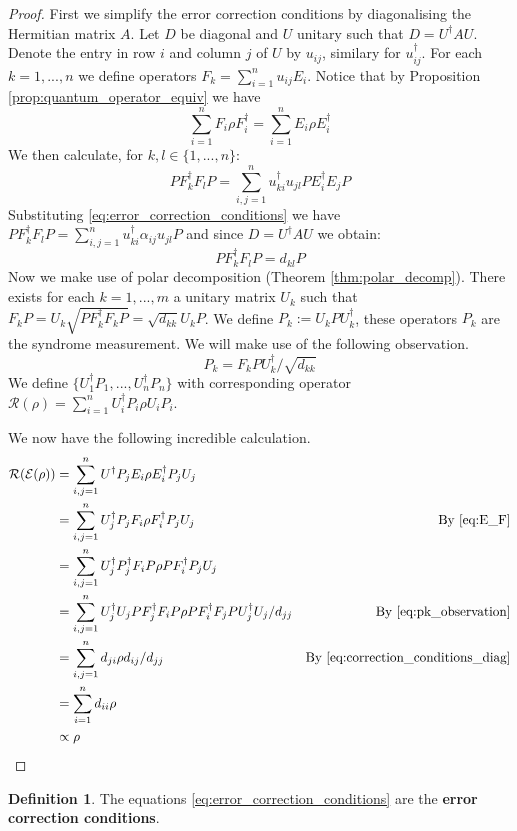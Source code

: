 \documentclass[12pt]{article}
\theoremstyle{plain}
\theoremstyle{definition}
\newtheorem{defn}[thm]{Definition} %
\newcommand{\call}[1]{\mathcal{#1}}
\begin{document}
\begin{proof}
	First we simplify the error correction conditions by diagonalising the Hermitian matrix $A$. Let $D$ be diagonal and $U$ unitary such that $D = U^\dagger A U$. Denote the entry in row $i$ and column $j$ of $U$ by $u_{ij}$, similary for $u_{ij}^\dagger$. For each $k = 1,...,n$ we define operators $F_k = \sum_{i = 1}^n u_{ij}E_i$. Notice that by Proposition \ref{prop:quantum_operator_equiv} we have
	\begin{equation}\label{eq:E_F}
		\sum_{i = 1}^n F_i \rho F_i^\dagger = \sum_{i = 1}^n E_i \rho E_i^\dagger
	\end{equation}
	We then calculate, for $k,l \in \lbrace 1,...,n\rbrace$:
	\begin{equation}
		PF_k^\dagger F_l P = \sum_{i,j = 1}^n u_{ki}^\dagger u_{jl}PE_i^\dagger E_j P
	\end{equation}
	Substituting \eqref{eq:error_correction_conditions} we have $PF_k^\dagger F_lP = \sum_{i,j= 1}^n u_{ki}^\dagger \alpha_{ij}u_{jl}P$ and since $D = U^\dagger A U$ we obtain:
	\begin{equation}\label{eq:correction_conditions_diag}
		PF_k^\dagger F_l P = d_{kl}P
	\end{equation}
	Now we make use of polar decomposition (Theorem \ref{thm:polar_decomp}). There exists for each $k = 1,...,m$ a unitary matrix $U_k$ such that $F_k P = U_k \sqrt{P F_k^\dagger F_k P} = \sqrt{d_{kk}}U_k P$. We define $P_k := U_k P U_k^\dagger$, these operators $P_k$ are the syndrome measurement. We will make use of the following observation.
	\begin{equation}\label{eq:pk_observation}
		P_k = F_k P U_k^\dagger/\sqrt{d_{kk}}
	\end{equation}
	We define $\lbrace U_1^\dagger P_1, ..., U_n^\dagger P_n \rbrace$ with corresponding operator $\call{R}(\rho) = \sum_{i = 1}^n U_i^\dagger P_i \rho U_i P_i$.
	
	We now have the following incredible calculation.
	\begin{align*}
		\call{R}(\call{E}(\rho)) &= \sum_{i,j = 1}^n U^\dagger P_j E_i \rho E_i^\dagger P_j U_j\\
		&= \sum_{i,j = 1}^n U_j^\dagger P_j F_i \rho F_i^\dagger P_j U_j & \text{By }\eqref{eq:E_F}\\
		&= \sum_{i,j = 1}^n U_j^\dagger P_j^\dagger F_i P \rho P F_i^\dagger P_j U_j\\
		&= \sum_{i,j = 1}^n U_j^\dagger U_j P F_j^\dagger F_i P \rho P F_i^\dagger F_j P U_j^\dagger U_j/d_{jj} & \text{By } \eqref{eq:pk_observation}\\
		&= \sum_{i,j = 1}^n d_{ji}\rho d_{ij}/d_{jj} & \text{By }\eqref{eq:correction_conditions_diag}\\
		&= \sum_{i = 1}^n d_{ii} \rho\\
		&\propto \rho
	\end{align*}
\end{proof}
\begin{defn}
	The equations \eqref{eq:error_correction_conditions} are the \textbf{error correction conditions}.
\end{defn}
	
\end{document}
